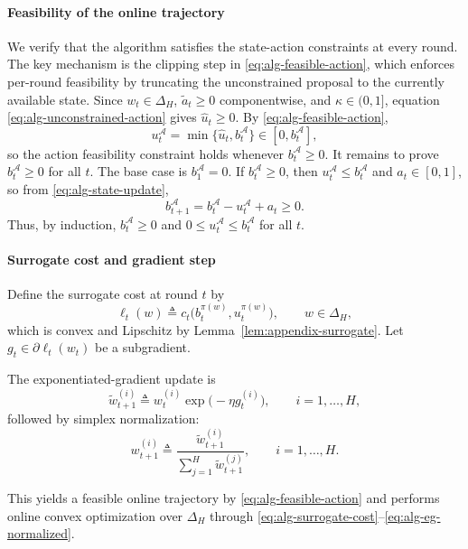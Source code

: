 \documentclass[11pt]{article}
\begin{document}
\paragraph{Feasibility of the online trajectory}
We verify that the algorithm satisfies the state-action constraints at every round. The key mechanism is the clipping step in \eqref{eq:alg-feasible-action}, which enforces per-round feasibility by truncating the unconstrained proposal to the currently available state. Since $w_t\in\Delta_H$, $\widetilde{a}_t\ge 0$ componentwise, and $\kappa\in(0,1]$, equation \eqref{eq:alg-unconstrained-action} gives $\widehat u_t\ge 0$. By \eqref{eq:alg-feasible-action},
\[
u_t^{\mathcal A}=\min\{\widehat u_t,b_t^{\mathcal A}\}\in[0,b_t^{\mathcal A}],
\]
so the action feasibility constraint holds whenever $b_t^{\mathcal A}\ge 0$. It remains to prove $b_t^{\mathcal A}\ge 0$ for all $t$. The base case is $b_1^{\mathcal A}=0$. If $b_t^{\mathcal A}\ge 0$, then $u_t^{\mathcal A}\le b_t^{\mathcal A}$ and $a_t\in[0,1]$, so from \eqref{eq:alg-state-update},
\[
b_{t+1}^{\mathcal A}=b_t^{\mathcal A}-u_t^{\mathcal A}+a_t\ge 0.
\]
Thus, by induction, $b_t^{\mathcal A}\ge 0$ and $0\le u_t^{\mathcal A}\le b_t^{\mathcal A}$ for all $t$.



\paragraph{Surrogate cost and gradient step}
Define the surrogate cost at round $t$ by
\begin{equation}
\label{eq:alg-surrogate-cost}
\ell_t(w) \triangleq c_t\bigl(b_t^{\pi(w)},u_t^{\pi(w)}\bigr), \qquad w\in\Delta_H,
\end{equation}
which is convex and Lipschitz by Lemma~\ref{lem:appendix-surrogate}. Let $g_t\in\partial \ell_t(w_t)$ be a subgradient.

The exponentiated-gradient update is
\begin{equation}
\label{eq:alg-eg-unnormalized}
\widetilde{w}_{t+1}^{(i)} \triangleq w_t^{(i)}\exp\!\bigl(-\eta g_t^{(i)}\bigr), \qquad i=1,\ldots,H,
\end{equation}
followed by simplex normalization:
\begin{equation}
\label{eq:alg-eg-normalized}
w_{t+1}^{(i)} \triangleq \frac{\widetilde{w}_{t+1}^{(i)}}{\sum_{j=1}^H \widetilde{w}_{t+1}^{(j)}}, \qquad i=1,\ldots,H.
\end{equation}

This yields a feasible online trajectory by \eqref{eq:alg-feasible-action} and performs online convex optimization over $\Delta_H$ through \eqref{eq:alg-surrogate-cost}--\eqref{eq:alg-eg-normalized}.
\end{document}
